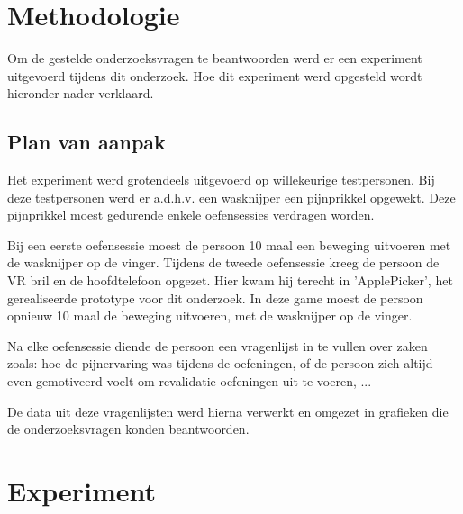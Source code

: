 
\chapter{Methodologie}
\label{ch:methodologie}


Om de gestelde onderzoeksvragen te beantwoorden werd er een experiment uitgevoerd tijdens dit onderzoek.
Hoe dit experiment werd opgesteld wordt hieronder nader verklaard.

\section{Plan van aanpak}

Het experiment werd grotendeels uitgevoerd op willekeurige testpersonen. Bij deze testpersonen werd er a.d.h.v. een wasknijper een pijnprikkel opgewekt. Deze pijnprikkel moest gedurende enkele oefensessies verdragen worden.

Bij een eerste oefensessie moest de persoon 10 maal een beweging uitvoeren met de wasknijper op de vinger. 
Tijdens de tweede oefensessie kreeg de persoon de VR bril en de hoofdtelefoon opgezet. Hier kwam hij terecht in 'ApplePicker', het gerealiseerde prototype voor dit onderzoek. In deze game moest de persoon opnieuw 10 maal de beweging uitvoeren, met de wasknijper op de vinger.

Na elke oefensessie diende de persoon een vragenlijst in te vullen 
over zaken zoals: hoe de pijnervaring was tijdens de oefeningen, of de persoon zich altijd even gemotiveerd voelt om revalidatie oefeningen uit te voeren, ...

De data uit deze vragenlijsten werd hierna verwerkt en omgezet in grafieken die de onderzoeksvragen konden beantwoorden.

\chapter{Experiment}

